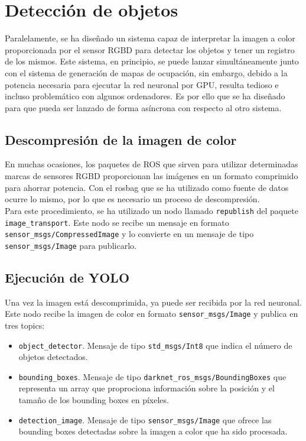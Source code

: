\section{Detección de objetos}

Paralelamente, se ha diseñado un sistema capaz de interpretar la imagen a color proporcionada por el sensor RGBD para detectar los objetos y tener un registro de los mismos. Este sistema, en principio, se puede lanzar simultáneamente junto con el sistema de generación de mapas de ocupación, sin embargo, debido a la potencia necesaria para ejecutar la red neuronal por GPU, resulta tedioso e incluso problemático con algunos ordenadores. Es por ello que se ha diseñado para que pueda ser lanzado de forma asíncrona con respecto al otro sistema.\\

\subsection{Descompresión de la imagen de color}

En muchas ocasiones, los paquetes de ROS que sirven para utilizar determinadas marcas de sensores RGBD proporcionan las imágenes en un formato comprimido para ahorrar potencia. Con el rosbag que se ha utilizado como fuente de datos ocurre lo mismo, por lo que es necesario un proceso de descompresión.\\

Para este procedimiento, se ha utilizado un nodo llamado \texttt{republish} del paquete \texttt{image\_transport}. Este nodo se recibe un mensaje en formato \texttt{sensor\_msgs/\-Compressed\-Image} y lo convierte en un mensaje de tipo \texttt{sensor\_msgs/Image} para publicarlo.\\

\subsection{Ejecución de YOLO}

Una vez la imagen está descomprimida, ya puede ser recibida por la red neuronal. Este nodo recibe la imagen de color en formato \texttt{sensor\_msgs/Image} y publica en tres topics:

\begin{itemize}

	\item \texttt{object\_detector}. Mensaje de tipo \texttt{std\_msgs/Int8} que indica el número de objetos detectados.
	\item \texttt{bounding\_boxes}. Mensaje de tipo \texttt{darknet\_ros\_msgs/BoundingBoxes} que representa un array que proprociona información sobre la posición y el tamaño de los bounding boxes en píxeles.
	\item \texttt{detection\_image}. Mensaje de tipo \texttt{sensor\_msgs/Image} que ofrece las bounding boxes detectadas sobre la imagen a color que ha sido procesada.
	
\end{itemize}

